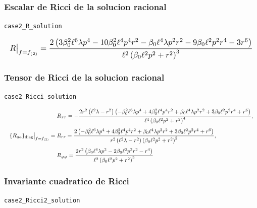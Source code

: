 \documentclass[11pt,a4paper]{article}
\begin{document}
\subsubsection{Escalar de Ricci de la solucion racional}

\noindent\texttt{case2\_R\_solution}\par\nopagebreak[4]

\[
\resizebox{\textwidth}{!}{$\displaystyle R\big|_{f=f_{(2)}} = \frac{2 \left(3 \beta_{0}^{2} \ell^{6} \lambda p^{4} - 10 \beta_{0}^{2} \ell^{4} p^{4} r^{2} - \beta_{0} \ell^{4} \lambda p^{2} r^{2} - 9 \beta_{0} \ell^{2} p^{2} r^{4} - 3 r^{6}\right)}{\ell^{2} \left(\beta_{0} \ell^{2} p^{2} + r^{2}\right)^{3}}$}
\]

\subsubsection{Tensor de Ricci de la solucion racional}

\noindent\texttt{case2\_Ricci\_solution}\par\nopagebreak[4]

\[
\resizebox{\textwidth}{!}{$\displaystyle \{R_{aa}\}_{\rm diag}\big|_{f=f_{(2)}} = \begin{aligned}&R_{\tau\tau}=- \frac{2 r^{2} \left(\ell^{2} \lambda - r^{2}\right) \left(- \beta_{0}^{2} \ell^{6} \lambda p^{4} + 4 \beta_{0}^{2} \ell^{4} p^{4} r^{2} + \beta_{0} \ell^{4} \lambda p^{2} r^{2} + 3 \beta_{0} \ell^{2} p^{2} r^{4} + r^{6}\right)}{\ell^{4} \left(\beta_{0} \ell^{2} p^{2} + r^{2}\right)^{4}},\\[4pt]&R_{rr}=\frac{2 \left(- \beta_{0}^{2} \ell^{6} \lambda p^{4} + 4 \beta_{0}^{2} \ell^{4} p^{4} r^{2} + \beta_{0} \ell^{4} \lambda p^{2} r^{2} + 3 \beta_{0} \ell^{2} p^{2} r^{4} + r^{6}\right)}{r^{2} \left(\ell^{2} \lambda - r^{2}\right) \left(\beta_{0} \ell^{2} p^{2} + r^{2}\right)^{2}},\\[4pt]&R_{\varphi\varphi}=\frac{2 r^{2} \left(\beta_{0} \ell^{4} \lambda p^{2} - 2 \beta_{0} \ell^{2} p^{2} r^{2} - r^{4}\right)}{\ell^{2} \left(\beta_{0} \ell^{2} p^{2} + r^{2}\right)^{2}}\end{aligned}$}
\]

\subsubsection{Invariante cuadratico de Ricci}

\noindent\texttt{case2\_Ricci2\_solution}\par\nopagebreak[4]
\end{document}
